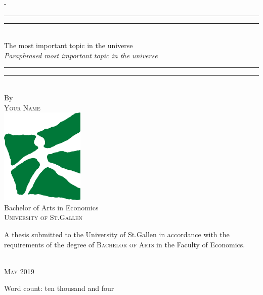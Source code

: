 %
%

\begin{titlingpage}
\begin{SingleSpace}
\calccentering{\unitlength} 
\begin{adjustwidth*}{\unitlength}{-\unitlength}
\vspace*{13mm}
\begin{center}
\rule[0.5ex]{\linewidth}{2pt}\vspace*{-\baselineskip}\vspace*{3.2pt}
\rule[0.5ex]{\linewidth}{1pt}\\[\baselineskip]
{\HUGE The most important topic in the universe}\\[4mm]
{\Large \textit{Paraphrased most important topic in the universe}}\\
\rule[0.5ex]{\linewidth}{1pt}\vspace*{-\baselineskip}\vspace{3.2pt}
\rule[0.5ex]{\linewidth}{2pt}\\
\vspace{6.5mm}
{\large By}\\
\vspace{6.5mm}
{\large\textsc{Your Name}}\\
\vspace{11mm}
\includegraphics[width=4cm]{logos/unisg.pdf}\\
\vspace{6mm}
{\large Bachelor of Arts in Economics\\
\textsc{University of St.Gallen}}\\
\vspace{11mm}
\begin{minipage}{10cm}
A thesis submitted to the University of St.Gallen in accordance with the requirements of the degree of \textsc{Bachelor of Arts} in the Faculty of Economics.
\end{minipage}\\
\vspace{9mm}
{\large\textsc{May 2019}}
\vspace{12mm}
\end{center}
\begin{flushright}
{\small Word count: ten thousand and four}
\end{flushright}
\end{adjustwidth*}
\end{SingleSpace}
\end{titlingpage}